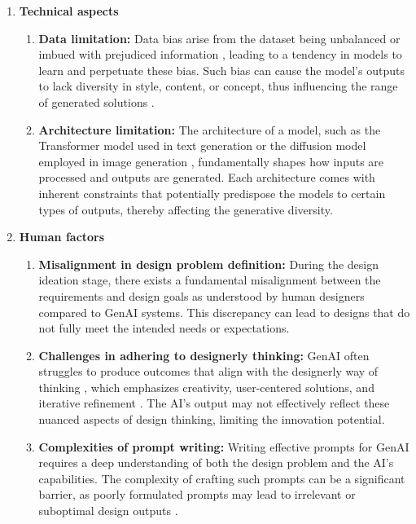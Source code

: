 \begin{enumerate}
    \item \textbf{Technical aspects}
    \begin{enumerate}
        \item \textbf{Data limitation:} Data bias arise from the dataset being unbalanced or imbued with prejudiced information \cite{manduchi2024challenges}, leading to a tendency in models to learn and perpetuate these bias. Such bias can cause the model’s outputs to lack diversity in style, content, or concept, thus influencing the range of generated solutions \cite{tan2020improving, jahanian2019steerability}.
        \item \textbf{Architecture limitation:} The architecture of a model, such as the Transformer model used in text generation \cite{vaswani2017attention} or the diffusion model employed in image generation \cite{ho2020denoising}, fundamentally shapes how inputs are processed and outputs are generated. Each architecture comes with inherent constraints that potentially predispose the models to certain types of outputs, thereby affecting the generative diversity. 
    \end{enumerate}
    \item \textbf{Human factors}
    \begin{enumerate}
        \item \textbf{Misalignment in design problem definition:} During the design ideation stage, there exists a fundamental misalignment between the requirements and design goals as understood by human designers compared to GenAI systems. This discrepancy can lead to designs that do not fully meet the intended needs or expectations.
        \item \textbf{Challenges in adhering to designerly thinking:} GenAI often struggles to produce outcomes that align with the designerly way of thinking \cite{chen2024designfusion}, which emphasizes creativity, user-centered solutions, and iterative refinement \cite{zhou2024understanding}. The AI's output may not effectively reflect these nuanced aspects of design thinking, limiting the innovation potential.
        \item \textbf{Complexities of prompt writing:} Writing effective prompts for GenAI requires a deep understanding of both the design problem and the AI's capabilities. The complexity of crafting such prompts can be a significant barrier, as poorly formulated prompts may lead to irrelevant or suboptimal design outputs \cite{brown2020language, wu2022ai}.
    \end{enumerate}
\end{enumerate}

